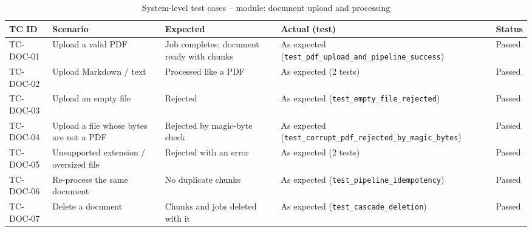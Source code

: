 \begin{table}[!htbp]
\centering
\caption{System-level test cases -- module: document upload and processing}\label{tab:tc_docs}
\tcbody
\begin{tabularx}{\textwidth}{@{}l Y Y Y l@{}}
\toprule
\textbf{TC ID} & \textbf{Scenario} & \textbf{Expected} & \textbf{Actual (test)} & \textbf{Status}\\
\midrule
TC-DOC-01 & Upload a valid PDF & Job completes; document ready with chunks & As expected (\texttt{test\_pdf\_upload\_and\_pipeline\_success}) & Passed\\
TC-DOC-02 & Upload Markdown / text & Processed like a PDF & As expected (2 tests) & Passed\\
TC-DOC-03 & Upload an empty file & Rejected & As expected (\texttt{test\_empty\_file\_rejected}) & Passed\\
TC-DOC-04 & Upload a file whose bytes are not a PDF & Rejected by magic-byte check & As expected (\texttt{test\_corrupt\_pdf\_rejected\_by\_magic\_bytes}) & Passed\\
TC-DOC-05 & Unsupported extension / oversized file & Rejected with an error & As expected (2 tests) & Passed\\
TC-DOC-06 & Re-process the same document & No duplicate chunks & As expected (\texttt{test\_pipeline\_idempotency}) & Passed\\
TC-DOC-07 & Delete a document & Chunks and jobs deleted with it & As expected (\texttt{test\_cascade\_deletion}) & Passed\\
\bottomrule
\end{tabularx}
\end{table}


